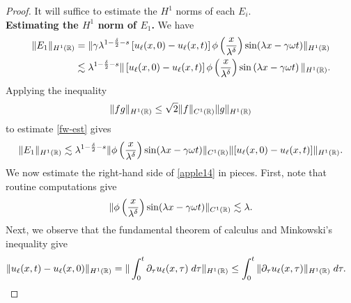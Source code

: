 \begin{proof}
    It will suffice to estimate the $H^1$ norms of each $E_i$. \vspace{0.25cm}\\
{\bf Estimating the $H^1$ norm of $\hyperref[all_errors_together]{E_1}$.} 
We have
%
%
\begin{equation}
\label{fw-est}
\begin{split}
\|E_1\|_{H^1(\mathbb{R})}
& = \| \gamma \lambda^{1 -\frac{\delta}{2}-s} \left[ u_\ell(x,0) - u_\ell(x,t) \right]
\phi\left( \frac{x}{\lambda^\delta}
\right ) \sin (\lambda x - \gamma \omega t )\|_{H^1(\mathbb{R})}
\\
& \lesssim \lambda^{1 -\frac{\delta}{2} -s } \|\left[ u_\ell(x,0) - 
u_\ell(x,t)
\right] \phi\left( \frac{x}{\lambda^\delta} \right )
\sin\left( \lambda x - \gamma \omega t
\right) \|_{H^1(\mathbb{R})}.
\end{split}
\end{equation}
%
%
Applying the inequality 
%
%
\begin{equation*}
\label{applec}
\|fg\|_{H^1(\mathbb{R})} \le \sqrt{2} \|f\|_{C^1(\mathbb{R})} \|g\|_{H^1(\mathbb{R})}
\end{equation*}
%
%
%
%
%
%
%
%
to estimate \eqref{fw-est} gives
%
%
\begin{equation}
\begin{split}
\|E_1\|_{H^1(\mathbb{R})} \lesssim \lambda^{1 - \frac{\delta}{2} -s } \|\phi
\left( \frac{x}{\lambda^\delta} \right) \sin (\lambda x - \gamma \omega t)
\|_{C^1(\mathbb{R})} \|[u_\ell (x,0) - u_\ell (x,t) ] \|_{H^1(\mathbb{R})}.
\label{apple14}
\end{split}
\end{equation}
%
%
We now estimate the right-hand side of \eqref{apple14} in pieces. First, 
note that routine computations give
%
%
\begin{equation}
\begin{split}
\|\phi\left( \frac{x}{\lambda^\delta} \right) \sin(\lambda x - \gamma 
\omega t)
\|_{C^1(\mathbb{R})}
\lesssim \lambda.
\label{apple15}
\end{split}
\end{equation}
%
%
Next, we observe that the fundamental 
theorem
of calculus and Minkowski's inequality give
%
%
%
%
\begin{equation}
\begin{split}
\|u_\ell(x,t) - u_\ell(x,0)\|_{H^1(\rr)}
& =  \| \int_0^t \p_\tau
u_\ell(x,\tau) \; d \tau \|_{H^1(\rr)}
\le \int_0^t \|\p_\tau u_\ell (x,\tau) \|_{H^1(\rr)} \; d \tau.
\label{apple100}
\end{split}

\end{equation}
\end{proof}
